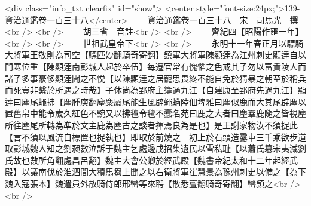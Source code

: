 <div class="info_txt clearfix" id="show">
<center style="font-size:24px;">139-資治通鑑卷一百三十八</center>
  　　資治通鑑卷一百三十八　宋　司馬光　撰<br />
<br />
　　胡三省　音註<br />
<br />
　　齊紀四【昭陽作噩一年】<br />
<br />
　　世祖武皇帝下<br />
<br />
　　永明十一年春正月以驃騎大將軍王敬則為司空【驃匹妙翻騎奇寄翻】鎮軍大將軍陳顯逹為江州刺史顯逹自以門寒位重【陳顯逹南彭城人起於卒伍】每遷官常有愧懼之色戒其子勿以富貴陵人而諸子多事豪侈顯逹聞之不悦【以陳顯逹之居寵思畏終不能自免於猜暴之朝至於稱兵而死豈非繫於所遇之時哉】子休尚為郢府主簿過九江【自建康至郢府先過九江】顯逹曰麈尾蠅拂【麈腫庾翻麈麋屬尾能生風辟蠅蜹陸佃埤雅曰麈似鹿而大其尾辟塵以置舊帛中能令歲久紅色不黦又以拂氊令氊不蠧名苑曰鹿之大者曰麈羣鹿隨之皆視麈所往麈尾所轉為凖於文主鹿為麈古之談者揮焉良為是也】是王謝家物汝不須捉此【言不須以風流自標置也捉執也】即取於前燒之　初上於石頭造露車三千乘欲步道取彭城魏人知之劉昶數泣訴于魏主乞處邊戌招集遺民以雪私耻【以蕭氏簒宋夷滅劉氏故也數所角翻處昌呂翻】魏主大會公卿於經武殿【魏書帝紀太和十二年起經武殿】以議南伐於淮泗間大積馬芻上聞之以右衛將軍崔慧景為豫州刺史以備之【為下魏入寇張本】魏遣員外散騎侍郎邢巒等來聘【散悉亶翻騎奇寄翻】巒頴之<br />
<br />
